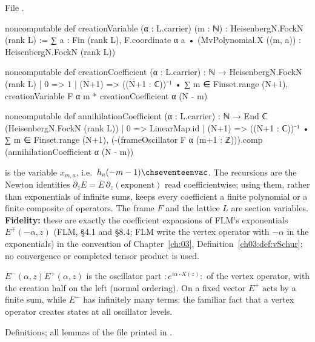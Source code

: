 \noindent File .
\begin{leancode}
noncomputable def creationVariable (α : L.carrier) (m : ℕ) : HeisenbergN.FockN (rank L) :=
  ∑ a : Fin (rank L), F.coordinate α a • (MvPolynomial.X ((m, a)) : HeisenbergN.FockN (rank L))

noncomputable def creationCoefficient (α : L.carrier) : ℕ → HeisenbergN.FockN (rank L)
  | 0 => 1
  | (N+1) => ((N+1 : ℂ))⁻¹ • ∑ m ∈ Finset.range (N+1), creationVariable F α m * creationCoefficient α (N - m)

noncomputable def annihilationCoefficient (α : L.carrier) : ℕ → End ℂ (HeisenbergN.FockN (rank L))
  | 0 => LinearMap.id
  | (N+1) => ((N+1 : ℂ))⁻¹ • ∑ m ∈ Finset.range (N+1),
      (-(frameOscillator F α (m+1 : ℤ))).comp (annihilationCoefficient α (N - m))
\end{leancode}

\begin{dictionary}
 is the variable $x_{m,a}$, i.e.\ $h_a(-m-1)\chseventeenvac$.  The recursions are
the Newton identities $\partial_zE=E\,\partial_z(\text{exponent})$ read coefficientwise; using them, rather
than exponentials of infinite sums, keeps every coefficient a finite polynomial or a finite composite of
operators.  The frame $F$ and the lattice $L$ are section variables.  \textbf{Fidelity:} these are exactly
the coefficient expansions of FLM's exponentials $E^\mp(-\alpha,z)$ (FLM, \S4.1 and \S8.4; FLM write the vertex operator with $-\alpha$ in the exponentials) in the convention of
Chapter~\ref{ch:03}, Definition~\ref{ch03:def:vSchur}; no convergence or completed tensor product is used.
\end{dictionary}

\begin{physics}
$E^-(\alpha,z)E^+(\alpha,z)$ is the oscillator part ${:}e^{i\alpha\cdot X(z)}{:}$ of the vertex operator, with
the creation half on the left (normal ordering).  On a fixed vector $E^+$ acts by a finite sum, while $E^-$
has infinitely many terms: the familiar fact that a vertex operator creates states at all oscillator levels.
\end{physics}

\begin{status}
Definitions; all lemmas of the file printed in .
\end{status}

